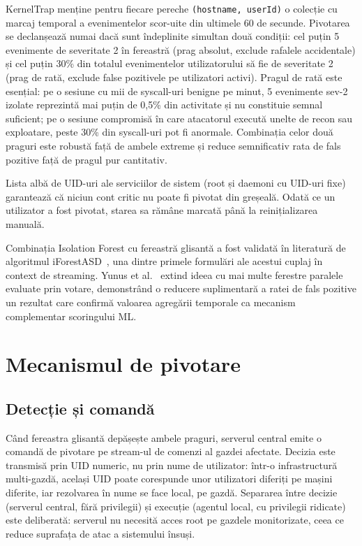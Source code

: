 KernelTrap menține pentru fiecare pereche \texttt{(hostname, userId)} o colecție cu marcaj
temporal a evenimentelor scor-uite din ultimele 60 de secunde. Pivotarea se declanșează numai
dacă sunt îndeplinite simultan două condiții: cel puțin 5 evenimente de severitate 2 în
fereastră (prag absolut, exclude rafalele accidentale) și cel puțin 30\% din totalul
evenimentelor utilizatorului să fie de severitate 2 (prag de rată, exclude false pozitivele pe
utilizatori activi). Pragul de rată este esențial: pe o sesiune cu mii de syscall-uri benigne
pe minut, 5 evenimente sev-2 izolate reprezintă mai puțin de 0,5\% din activitate și nu
constituie semnal suficient; pe o sesiune compromisă în care atacatorul execută unelte de recon
sau exploatare, peste 30\% din syscall-uri pot fi anormale. Combinația celor două praguri este
robustă față de ambele extreme și reduce semnificativ rata de fals pozitive față de pragul
pur cantitativ.

Lista albă de UID-uri ale serviciilor de sistem (root și daemoni cu UID-uri fixe) garantează că
niciun cont critic nu poate fi pivotat din greșeală. Odată ce un utilizator a fost pivotat,
starea sa rămâne marcată până la reinițializarea manuală.

Combinația Isolation Forest cu fereastră glisantă a fost validată în literatură de
algoritmul iForestASD~\cite{ding2024iforestasd}, una dintre primele formulări ale acestui cuplaj
în context de streaming. Yunus et al.~\cite{yunus2024sliding} extind ideea cu mai multe ferestre
paralele evaluate prin votare, demonstrând o reducere suplimentară a ratei de fals pozitive un
rezultat care confirmă valoarea agregării temporale ca mecanism complementar scoringului ML.

\section{Mecanismul de pivotare}

\subsection{Detecție și comandă}

Când fereastra glisantă depășește ambele praguri, serverul central emite o comandă de
pivotare pe stream-ul de comenzi al gazdei afectate. Decizia este transmisă prin UID
numeric, nu prin nume de utilizator: într-o infrastructură multi-gazdă, același UID poate
corespunde unor utilizatori diferiți pe mașini diferite, iar rezolvarea în nume se face
local, pe gazdă. Separarea între decizie (serverul central, fără privilegii) și execuție
(agentul local, cu privilegii ridicate) este deliberată: serverul nu necesită acces root pe
gazdele monitorizate, ceea ce reduce suprafața de atac a sistemului însuși.


